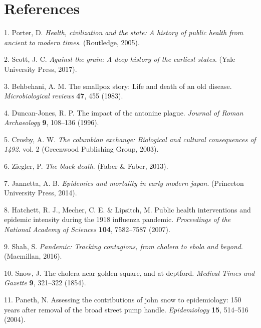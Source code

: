 \documentclass[]{article}
\begin{document}
\hypertarget{references}{%
\section*{References}\label{references}}

\hypertarget{refs}{}
\leavevmode\hypertarget{ref-porter2005health}{}%
1. Porter, D. \emph{Health, civilization and the state: A history of public health from ancient to modern times}. (Routledge, 2005).

\leavevmode\hypertarget{ref-scott2017against}{}%
2. Scott, J. C. \emph{Against the grain: A deep history of the earliest states}. (Yale University Press, 2017).

\leavevmode\hypertarget{ref-behbehani1983smallpox}{}%
3. Behbehani, A. M. The smallpox story: Life and death of an old disease. \emph{Microbiological reviews} \textbf{47}, 455 (1983).

\leavevmode\hypertarget{ref-duncan1996impact}{}%
4. Duncan-Jones, R. P. The impact of the antonine plague. \emph{Journal of Roman Archaeology} \textbf{9}, 108--136 (1996).

\leavevmode\hypertarget{ref-crosby2003columbian}{}%
5. Crosby, A. W. \emph{The columbian exchange: Biological and cultural consequences of 1492}. vol. 2 (Greenwood Publishing Group, 2003).

\leavevmode\hypertarget{ref-ziegler2013black}{}%
6. Ziegler, P. \emph{The black death}. (Faber \& Faber, 2013).

\leavevmode\hypertarget{ref-jannetta2014epidemics}{}%
7. Jannetta, A. B. \emph{Epidemics and mortality in early modern japan}. (Princeton University Press, 2014).

\leavevmode\hypertarget{ref-hatchett2007public}{}%
8. Hatchett, R. J., Mecher, C. E. \& Lipsitch, M. Public health interventions and epidemic intensity during the 1918 influenza pandemic. \emph{Proceedings of the National Academy of Sciences} \textbf{104}, 7582--7587 (2007).

\leavevmode\hypertarget{ref-shah2016pandemic}{}%
9. Shah, S. \emph{Pandemic: Tracking contagions, from cholera to ebola and beyond}. (Macmillan, 2016).

\leavevmode\hypertarget{ref-snow1854cholera}{}%
10. Snow, J. The cholera near golden-square, and at deptford. \emph{Medical Times and Gazette} \textbf{9}, 321--322 (1854).

\leavevmode\hypertarget{ref-paneth2004assessing}{}%
11. Paneth, N. Assessing the contributions of john snow to epidemiology: 150 years after removal of the broad street pump handle. \emph{Epidemiology} \textbf{15}, 514--516 (2004).
\end{document}

